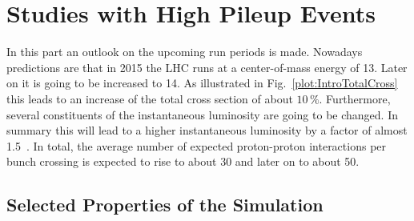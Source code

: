 \chapter{Studies with High Pileup Events \label{sec:HPU}}

In this part an outlook on the upcoming run periods is made. Nowadays predictions are that in 2015 the LHC runs at a center-of-mass energy of 13\TeV. Later on it is going to be increased to 14\TeV. As illustrated in Fig.~\ref{plot:IntroTotalCross} this leads to an increase of the total cross section of about $10\,\%$. Furthermore, several constituents of the instantaneous luminosity are going to be changed. In summary this will lead to a higher instantaneous luminosity by a factor of almost 1.5~\cite{LHCUpgrade}. In total, the average number of expected proton-proton interactions per bunch crossing is expected to rise to about 30 and later on to about 50.

\section{Selected Properties of the Simulation \label{sec:HPUSim}}

